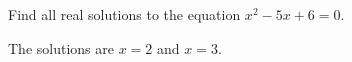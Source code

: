 \question Find all real solutions to the equation $x^2 - 5x + 6 = 0$.
\begin{solution}
The solutions are $x = 2$ and $x = 3$.
\end{solution}
